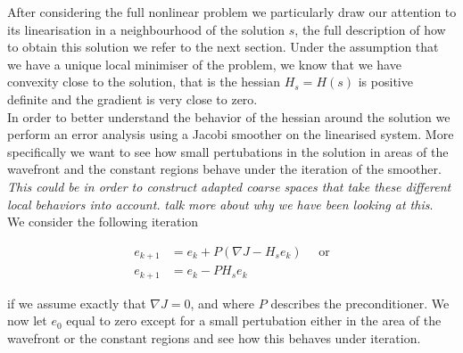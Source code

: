 \documentclass[../draft_1.tex]{subfiles}
\begin{document}
After considering the full nonlinear problem we particularly draw our attention to its linearisation in a neighbourhood of the solution $s$, the full description of how to obtain this solution we refer to the next section. Under the assumption that we have a unique local minimiser of the problem, we know that we have convexity close to the solution, that is the hessian $H_s = H(s)$ is positive definite and the gradient is very close to zero. \\
In order to better understand the behavior of the hessian around the solution we perform an error analysis using a Jacobi smoother on the linearised system. More specifically we want to see how small pertubations in the solution in areas of the wavefront and the constant regions behave under the iteration of the smoother. \textit{This could be in order to construct adapted coarse spaces that take these different local behaviors into account.} \textit{talk more about why we have been looking at this}. \\ 
We consider the following iteration 
\begin{ceqn}
	\begin{equation}
	\begin{aligned}
e_{k+1} &= e_k + P(\nabla J - H_s e_k) \quad \text{ or} \\
e_{k+1} &= e_k - P H_s e_k 
	\end{aligned}
	\end{equation}
\end{ceqn}
if we assume exactly that $\nabla J = 0$, and where $P$ describes the preconditioner. We now let $e_0$ equal to zero except for a small pertubation either in the area of the wavefront or the constant regions and see how this behaves under iteration.
\end{document}
